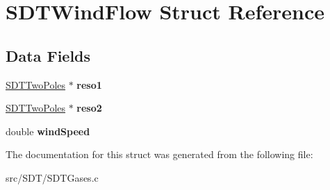 \hypertarget{struct_s_d_t_wind_flow}{}\section{S\+D\+T\+Wind\+Flow Struct Reference}
\label{struct_s_d_t_wind_flow}
\subsection*{Data Fields}
\begin{DoxyCompactItemize}
\item 
\hypertarget{struct_s_d_t_wind_flow_a094609f6a6e339abd0a546926d0c5d87}{}\hyperlink{struct_s_d_t_two_poles}{S\+D\+T\+Two\+Poles} $\ast$ {\bfseries reso1}\label{struct_s_d_t_wind_flow_a094609f6a6e339abd0a546926d0c5d87}

\item 
\hypertarget{struct_s_d_t_wind_flow_a96c0f0a576271b9d306b5c452fdc7133}{}\hyperlink{struct_s_d_t_two_poles}{S\+D\+T\+Two\+Poles} $\ast$ {\bfseries reso2}\label{struct_s_d_t_wind_flow_a96c0f0a576271b9d306b5c452fdc7133}

\item 
\hypertarget{struct_s_d_t_wind_flow_a1e61109612ce4b40408c03d7d23405c5}{}double {\bfseries wind\+Speed}\label{struct_s_d_t_wind_flow_a1e61109612ce4b40408c03d7d23405c5}

\end{DoxyCompactItemize}


The documentation for this struct was generated from the following file\+:\begin{DoxyCompactItemize}
\item 
src/\+S\+D\+T/S\+D\+T\+Gases.\+c\end{DoxyCompactItemize}
